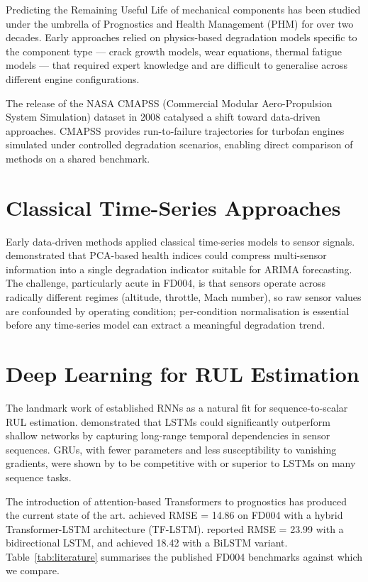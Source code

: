 \documentclass[12pt,a4paper]{report}
\begin{document}
Predicting the Remaining Useful Life of mechanical components has been studied under the umbrella of Prognostics and Health Management (PHM) for over two decades. Early approaches relied on physics-based degradation models specific to the component type — crack growth models, wear equations, thermal fatigue models — that required expert knowledge and are difficult to generalise across different engine configurations.

The release of the NASA CMAPSS (Commercial Modular Aero-Propulsion System Simulation) dataset \cite{saxena2008damage} in 2008 catalysed a shift toward data-driven approaches. CMAPSS provides run-to-failure trajectories for turbofan engines simulated under controlled degradation scenarios, enabling direct comparison of methods on a shared benchmark.

\section{Classical Time-Series Approaches}

Early data-driven methods applied classical time-series models to sensor signals. \citet{malhi2011pca} demonstrated that PCA-based health indices could compress multi-sensor information into a single degradation indicator suitable for ARIMA forecasting. The challenge, particularly acute in FD004, is that sensors operate across radically different regimes (altitude, throttle, Mach number), so raw sensor values are confounded by operating condition; per-condition normalisation is essential before any time-series model can extract a meaningful degradation trend.

\section{Deep Learning for RUL Estimation}

The landmark work of \citet{heimes2008recurrent} established RNNs as a natural fit for sequence-to-scalar RUL estimation. \citet{zheng2017long} demonstrated that LSTMs could significantly outperform shallow networks by capturing long-range temporal dependencies in sensor sequences. GRUs, with fewer parameters and less susceptibility to vanishing gradients, were shown by \citet{cho2014gru} to be competitive with or superior to LSTMs on many sequence tasks.

The introduction of attention-based Transformers \cite{vaswani2017attention} to prognostics has produced the current state of the art. \citet{song2022transformer} achieved RMSE = 14.86 on FD004 with a hybrid Transformer-LSTM architecture (TF-LSTM). \citet{zhang2018blstm} reported RMSE = 23.99 with a bidirectional LSTM, and \citet{zhao2020bilstm} achieved 18.42 with a BiLSTM variant. Table~\ref{tab:literature} summarises the published FD004 benchmarks against which we compare.
\end{document}

